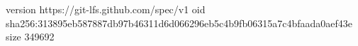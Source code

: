 version https://git-lfs.github.com/spec/v1
oid sha256:313895eb587887db97b46311d6d066296eb5c4b9fb06315a7c4bfaada0aef43e
size 349692
